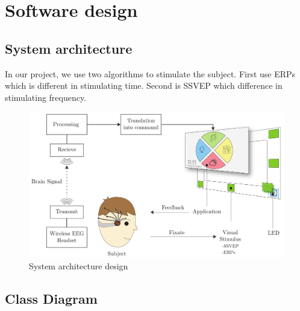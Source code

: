\chapter{Software design}

\label{ch:Software design}

\setlength{\parindent}{4em}
\setlength{\parskip}{1em}
\renewcommand{\baselinestretch}{1.5}

\section{System architecture}

\hspace{1.5cm}In our project, we use two algorithms to stimulate the subject. First use ERPs which is different in stimulating time. Second is SSVEP which difference in stimulating frequency.

\begin{figure}[ht]
	\centering
	\includegraphics[scale = 0.28]{chapter5/architec.pdf}
	\caption{System architecture design}
\end{figure}

\newpage
\section{Class Diagram}

